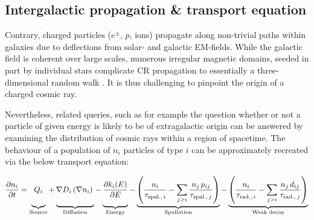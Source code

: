 \subsection{Intergalactic propagation \& transport equation}
\label{ssec:transport-equation}

Contrary, charged particles ($e^\pm$, $p$, ions) propagate along non-trivial paths within galaxies due to deflections from solar- and galactic EM-fields. While the 
galactic field is coherent over large scales, numerous irregular magnetic domains, seeded in part by individual stars complicate CR propagation to essentially a 
three-dimensional random walk \cite{haverkorn2015magnetic}. It is thus challenging to pinpoint the origin of a charged cosmic ray. 

Nevertheless, related queries, such as for example the question whether or not a particle of given energy is likely to be of extragalactic origin can be answered by
examining the distribution of cosmic rays within a region of spacetime. The behaviour of a population of $n_i$ particles of type $i$ can be approximately recreated 
via the below transport equation:

\begin{equation*}
\label{eq:leaky-box-model}
\frac{\partial n_i}{\partial t} =   \underbrace{Q_i \vphantom{\left(\sum\limits_{j>i}\frac{p_{ij}}{\tau_{\text{spal.},\,j}} n_j\right)}}_\text{Source} 
 								  + \underbrace{\nabla D_i \left( \nabla n_i \right) \vphantom{\left(\sum\limits_{j>i}\frac{p_{ij}}{\tau_{\text{spal.},\,j}} n_j\right)}}_\text{Diffusion} 
								  - \underbrace{\frac{\partial k_i(E)}{\partial E} \vphantom{\left(\sum\limits_{j>i}\frac{p_{ij}}{\tau_{\text{spal.},\,j}} n_j\right)}}_\text{Energy} 
								  - \underbrace{\left( \frac{n_i}{\tau_{\text{spal.},\,i}} - \sum\limits_{j>i} \frac{n_j\,p_{ij}}{\tau_{\text{spal.},\,j}} \right)}_\text{Spallation}
								  - \underbrace{\left( \frac{n_i}{\tau_{\text{rad.},\,i}} - \sum\limits_{j>i} \frac{ n_j\,d_{ij}}{\tau_{\text{rad.},\,j}} \right)}_\text{Weak decay}
\end{equation*}

